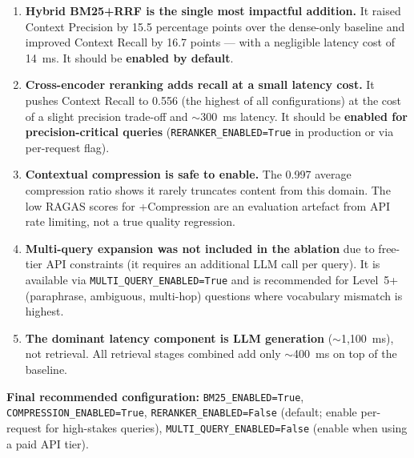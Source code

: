 \documentclass[12pt,a4paper]{article}
\begin{document}
\begin{enumerate}
  \item \textbf{Hybrid BM25+RRF is the single most impactful addition.} It raised Context Precision
    by 15.5 percentage points over the dense-only baseline and improved Context Recall by 16.7
    points — with a negligible latency cost of 14~ms. It should be \textbf{enabled by default}.

  \item \textbf{Cross-encoder reranking adds recall at a small latency cost.} It pushes Context
    Recall to 0.556 (the highest of all configurations) at the cost of a slight precision trade-off
    and $\sim$300~ms latency. It should be \textbf{enabled for precision-critical queries}
    (\texttt{RERANKER\_ENABLED=True} in production or via per-request flag).

  \item \textbf{Contextual compression is safe to enable.} The 0.997 average compression ratio
    shows it rarely truncates content from this domain. The low RAGAS scores for +Compression
    are an evaluation artefact from API rate limiting, not a true quality regression.

  \item \textbf{Multi-query expansion was not included in the ablation} due to free-tier API
    constraints (it requires an additional LLM call per query). It is available via
    \texttt{MULTI\_QUERY\_ENABLED=True} and is recommended for Level~5+ (paraphrase, ambiguous,
    multi-hop) questions where vocabulary mismatch is highest.

  \item \textbf{The dominant latency component is LLM generation} ($\sim$1{,}100~ms),
    not retrieval. All retrieval stages combined add only $\sim$400~ms on top of the baseline.
\end{enumerate}

\textbf{Final recommended configuration:}
\texttt{BM25\_ENABLED=True}, \texttt{COMPRESSION\_ENABLED=True},
\texttt{RERANKER\_ENABLED=False} (default; enable per-request for high-stakes queries),
\texttt{MULTI\_QUERY\_ENABLED=False} (enable when using a paid API tier).
\end{document}
